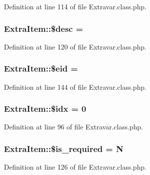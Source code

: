 Definition at line 114 of file Extravar.\+class.\+php.

\hypertarget{classExtraItem_a47059cf3ac48f0d31c5358fa5e97f106}{}
\subsubsection[{\$desc}]{\setlength{\rightskip}{0pt plus 5cm}Extra\+Item\+::\$desc = \textquotesingle{}\textquotesingle{}}\label{classExtraItem_a47059cf3ac48f0d31c5358fa5e97f106}


Definition at line 120 of file Extravar.\+class.\+php.

\hypertarget{classExtraItem_a8a68f26bb602679ebf4095e774425092}{}
\subsubsection[{\$eid}]{\setlength{\rightskip}{0pt plus 5cm}Extra\+Item\+::\$eid = \textquotesingle{}\textquotesingle{}}\label{classExtraItem_a8a68f26bb602679ebf4095e774425092}


Definition at line 144 of file Extravar.\+class.\+php.

\hypertarget{classExtraItem_aadcda4aa903481b261d86bc50ab1c238}{}
\subsubsection[{\$idx}]{\setlength{\rightskip}{0pt plus 5cm}Extra\+Item\+::\$idx = 0}\label{classExtraItem_aadcda4aa903481b261d86bc50ab1c238}


Definition at line 96 of file Extravar.\+class.\+php.

\hypertarget{classExtraItem_a616da9975ea87e9b61b6b9a2daf5e769}{}
\subsubsection[{\$is\+\_\+required}]{\setlength{\rightskip}{0pt plus 5cm}Extra\+Item\+::\$is\+\_\+required = \textquotesingle{}N\textquotesingle{}}\label{classExtraItem_a616da9975ea87e9b61b6b9a2daf5e769}


Definition at line 126 of file Extravar.\+class.\+php.

